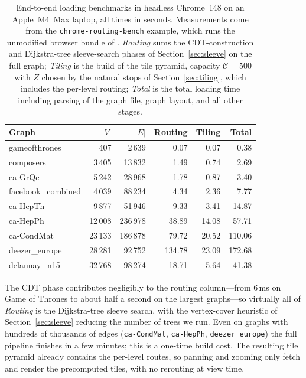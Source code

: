 \documentclass[a4paper,USenglish,anonymous]{gd-lipics-v3}
\newcommand{\msagljs}{\textsf{\libname}}
\begin{document}
\begin{table}[t]
  \centering
  \scriptsize
  \setlength{\tabcolsep}{6pt}
  \begin{tabular}{@{}lrrrrr@{}}
    \toprule
    Graph & $|V|$ & $|E|$ & Routing & Tiling & Total \\
    \midrule
    gameofthrones      &     407 &   2\,639 &   0.07 &   0.07 &   0.38 \\
    composers          &  3\,405 &  13\,832 &   1.49 &   0.74 &   2.69 \\
    ca-GrQc            &  5\,242 &  28\,968 &   1.78 &   0.87 &   3.40 \\
    facebook\_combined &  4\,039 &  88\,234 &   4.34 &   2.36 &   7.77 \\
    ca-HepTh           &  9\,877 &  51\,946 &   9.33 &   3.41 &  14.87 \\
    ca-HepPh           & 12\,008 & 236\,978 &  38.89 &  14.08 &  57.71 \\
    ca-CondMat         & 23\,133 & 186\,878 &  79.72 &  20.52 & 110.06 \\
    deezer\_europe     & 28\,281 &  92\,752 & 134.78 &  23.09 & 172.68 \\
    delaunay\_n15      & 32\,768 &  98\,274 &  18.71 &   5.64 &  41.38 \\
    \bottomrule
  \end{tabular}
  \caption{End-to-end loading benchmarks in headless Chrome~148 on an
    Apple~M4~Max laptop, all times in seconds. Measurements come from
    the \texttt{chrome-routing-bench} example, which runs the
    unmodified browser bundle of \msagljs{}. \emph{Routing} sums the
    CDT-construction and Dijkstra-tree sleeve-search phases of
    Section~\ref{sec:sleeve} on the full graph; \emph{Tiling} is the
    build of the tile pyramid, capacity $\mathcal{C}=500$ with $Z$
    chosen by the natural stops of Section~\ref{sec:tiling}, which
    includes the per-level routing; \emph{Total} is the total
    loading time including parsing of the graph file, graph layout,
    and all other stages.}
  \label{tab:perf}
\end{table}

The CDT phase contributes negligibly to the routing column---from 6\,ms on Game of Thrones to about half a second on the largest graphs---so virtually all of \emph{Routing} is the Dijkstra-tree sleeve search, with the vertex-cover heuristic of Section~\ref{sec:sleeve} reducing the number of trees we run. Even on graphs with hundreds of thousands of edges (\texttt{ca-CondMat}, \texttt{ca-HepPh}, \texttt{deezer\_europe}) the full pipeline finishes in a few minutes; this is a one-time build cost. The resulting tile pyramid already contains the per-level routes, so panning and zooming only fetch and render the precomputed tiles, with no rerouting at view time.
\end{document}
